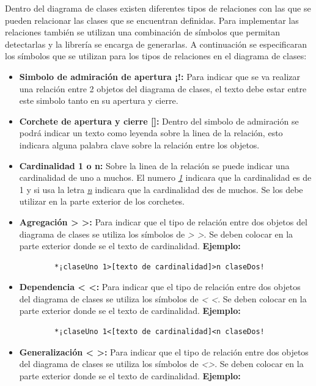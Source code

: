 Dentro del diagrama de clases existen diferentes tipos de relaciones con las que se pueden relacionar las clases que se encuentran definidas. Para implementar las relaciones también se utilizan una combinación de símbolos que permitan detectarlas y la librería se encarga de generarlas. A continuación se especificaran los símbolos que se utilizan para los tipos de relaciones en el diagrama de clases:

\begin{itemize}
	\item \textbf{Simbolo de admiración de apertura ¡!:} Para indicar que se va realizar una relación entre 2 objetos del diagrama de clases, el texto debe estar entre este simbolo tanto en su apertura y cierre.
	
	\item \textbf{Corchete de apertura y cierre []:} Dentro del simbolo de admiración se podrá indicar un texto como leyenda sobre la linea de la relación, esto indicara alguna palabra clave sobre la relación entre los objetos.
	
	\item \textbf{Cardinalidad 1 o n:} Sobre la linea de la relación se puede indicar una cardinalidad de uno a muchos. El numero \textit{\underline{1}} indicara que la cardinalidad es de 1 y si usa la letra \textit{\underline{n}} indicara que la cardinalidad des de muchos. Se los debe utilizar en la parte exterior de los corchetes.
	
	\item \textbf{Agregación > >:} Para indicar que el tipo de relación entre dos objetos del diagrama de clases se utiliza los símbolos de \textit{> >}. Se deben colocar en la parte exterior donde se el texto de cardinalidad. \textbf{Ejemplo:}
	
	\begin{verbatim}
		*¡claseUno 1>[texto de cardinalidad]>n claseDos!
	\end{verbatim}

	\item \textbf{Dependencia < <:} Para indicar que el tipo de relación entre dos objetos del diagrama de clases se utiliza los símbolos de \textit{< <}. Se deben colocar en la parte exterior donde se el texto de cardinalidad. \textbf{Ejemplo:}
	
	\begin{verbatim}
		*¡claseUno 1<[texto de cardinalidad]<n claseDos!
	\end{verbatim}

	\item \textbf{Generalización < >:} Para indicar que el tipo de relación entre dos objetos del diagrama de clases se utiliza los símbolos de \textit{<>}. Se deben colocar en la parte exterior donde se el texto de cardinalidad. \textbf{Ejemplo:}
	

\end{itemize}
